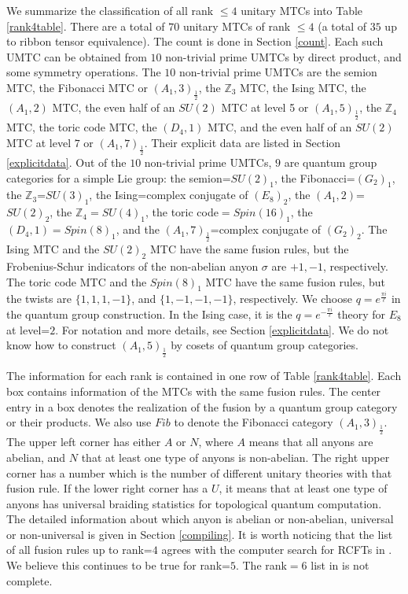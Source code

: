 \documentclass[12pt,psamsfonts]{amsart}
\newcommand{\Z}{\mathbb Z}
\numberwithin{equation}{section}
\theoremstyle{definition}
\begin{document}
We summarize the classification of all rank $\leq 4$ unitary MTCs
into Table \ref{rank4table}. There are a total of $70$ unitary
MTCs of rank $\leq 4$ (a total of $35$ up to ribbon tensor equivalence).
The count is done in Section \ref{count}.  Each such UMTC can be obtained
from $10$ non-trivial prime UMTCs by direct product, and some
symmetry operations.  The $10$ non-trivial prime UMTCs are the
semion MTC, the Fibonacci MTC or $(A_1,3)_{\frac{1}{2}}$, the
$\Z_3$ MTC, the Ising MTC, the $(A_1,2)$ MTC, the even half of an
$SU(2)$ MTC at level 5 or $(A_1,5)_{\frac{1}{2}}$, the $\Z_4$ MTC,
the toric code MTC, the $(D_4,1)$ MTC, and the even half of an
$SU(2)$ MTC at level $7$ or $(A_1,7)_{\frac{1}{2}}$. Their
explicit data are listed in Section \ref{explicitdata}. Out of the
$10$ non-trivial prime UMTCs, $9$ are quantum group categories for
a simple Lie group: the semion=$SU(2)_1$, the Fibonacci=$(G_2)_1$,
the $\Z_3$=$SU(3)_1$, the Ising=complex conjugate of $(E_8)_2$,
the $(A_1,2)$=$SU(2)_2$, the $\Z_4=SU(4)_1$, the toric
code$=Spin(16)_1$, the $(D_4,1)=Spin(8)_1$, and the
$(A_1,7)_{\frac{1}{2}}$=complex conjugate of $(G_2)_2$.
The Ising MTC and the $SU(2)_2$
MTC have the same fusion rules, but the Frobenius-Schur indicators
of the non-abelian anyon $\sigma$ are $+1,-1$, respectively.  The
toric code MTC and the $Spin(8)_1$ MTC have the same fusion rules,
but the twists are $\{1,1,1,-1\}$, and $\{1,-1,-1,-1\}$,
respectively.  We choose $q=e^{\frac{\pi i}{\ell}}$ in the quantum
group construction. In the Ising case, it is the $q=e^{-\frac{\pi
i}{\ell}}$ theory for $E_8$ at level=$2$. For notation and more
details, see Section \ref{explicitdata}.  We do not know how to construct
$(A_1,5)_{\frac{1}{2}}$ by cosets of quantum group categories.

 The information for each rank is contained in one row of Table \ref{rank4table}.
 Each box contains
information of the MTCs with the same fusion rules. The center
entry in a box denotes the realization of the fusion by a quantum
group category or their products.  We also use $Fib$ to denote the
Fibonacci category $(A_1,3)_{\frac{1}{2}}$. The upper left corner
has either $A$ or $N$, where $A$ means that all anyons are
abelian, and $N$ that at least one type of anyons is non-abelian.
The right upper corner has a number which is the number of
different unitary theories with that fusion rule.  If the lower
right corner has a $U$, it means that at least one type of anyons
has universal braiding statistics for topological quantum
computation.  The detailed information about which anyon is
abelian or non-abelian, universal or non-universal is given in
Section \ref{compiling}.  It is worth
noticing that the list of all fusion rules up to rank=$4$ agrees
with the computer search for RCFTs in \cite{GK}.  We believe this
continues to be true for rank=$5$.  The rank$=6$ list in
\cite{GK} is not complete.
\end{document}
